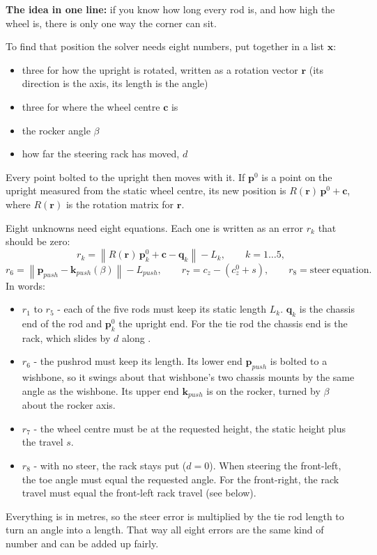 \textbf{The idea in one line:} if you know how long every rod is, and how high the wheel is, there is only one way the corner can sit.

To find that position the solver needs eight numbers, put together in a list $\mathbf{x}$:
\begin{itemize}
    \item three for how the upright is rotated, written as a rotation vector $\mathbf{r}$ (its direction is the axis, its length is the angle)
    \item three for where the wheel centre $\mathbf{c}$ is
    \item the rocker angle $\beta$
    \item how far the steering rack has moved, $d$
\end{itemize}
Every point bolted to the upright then moves with it. If $\mathbf{p}^0$ is a point on the upright measured from the static wheel centre, its new position is $R(\mathbf{r})\,\mathbf{p}^0 + \mathbf{c}$, where $R(\mathbf{r})$ is the rotation matrix for $\mathbf{r}$.

Eight unknowns need eight equations. Each one is written as an error $r_k$ that should be zero:
\begin{equation}
    r_k = \left\| R(\mathbf{r})\,\mathbf{p}^0_k + \mathbf{c} - \mathbf{q}_k \right\| - L_k, \qquad k = 1\dots5,
\end{equation}
\begin{equation}
    r_6 = \left\| \mathbf{p}_{push} - \mathbf{k}_{push}(\beta) \right\| - L_{push}, \qquad r_7 = c_z - (c_z^0 + s), \qquad r_8 = \mathrm{steer\ equation}.
\end{equation}
In words:
\begin{itemize}
    \item $r_1$ to $r_5$ - each of the five rods must keep its static length $L_k$. $\mathbf{q}_k$ is the chassis end of the rod and $\mathbf{p}^0_k$ the upright end. For the tie rod the chassis end is the rack, which slides by $d$ along .
    \item $r_6$ - the pushrod must keep its length. Its lower end $\mathbf{p}_{push}$ is bolted to a wishbone, so it swings about that wishbone's two chassis mounts by the same angle as the wishbone. Its upper end $\mathbf{k}_{push}$ is on the rocker, turned by $\beta$ about the rocker axis.
    \item $r_7$ - the wheel centre must be at the requested height, the static height plus the travel $s$.
    \item $r_8$ - with no steer, the rack stays put ($d = 0$). When steering the front-left, the toe angle must equal the requested angle. For the front-right, the rack travel must equal the front-left rack travel (see below).
\end{itemize}
Everything is in metres, so the steer error is multiplied by the tie rod length to turn an angle into a length. That way all eight errors are the same kind of number and can be added up fairly.

